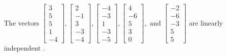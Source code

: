 \begin{exercise}
\begin{exerciseStatement}
  \end{exerciseStatement}
  \begin{exerciseAnswer}
   The vectors \(\left[\begin{array}{r}
3 \\
5 \\
5 \\
1 \\
-4
\end{array}\right] , \left[\begin{array}{r}
2 \\
-1 \\
3 \\
-3 \\
-4
\end{array}\right] , \left[\begin{array}{r}
-4 \\
-3 \\
1 \\
-3 \\
-5
\end{array}\right] , \left[\begin{array}{r}
4 \\
-6 \\
5 \\
3 \\
0
\end{array}\right] , \text{ and } \left[\begin{array}{r}
-2 \\
-6 \\
-3 \\
5 \\
5
\end{array}\right]\) are 
  	 linearly independent  .
  


  \end{exerciseAnswer}
\end{exercise}